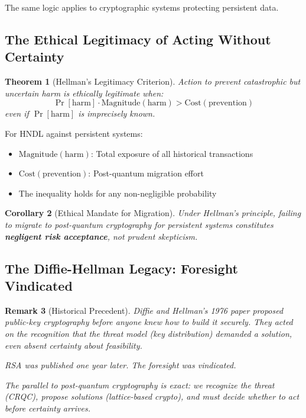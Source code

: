 \documentclass[11pt,a4paper]{article}
\newtheorem{theorem}{Theorem}[section]
\newtheorem{corollary}[theorem]{Corollary}
\newtheorem{remark}[theorem]{Remark}
\begin{document}
The same logic applies to cryptographic systems protecting persistent data.

\subsection{The Ethical Legitimacy of Acting Without Certainty}

\begin{theorem}[Hellman's Legitimacy Criterion]
Action to prevent catastrophic but uncertain harm is ethically legitimate when:
\begin{equation}
\Pr[\text{harm}] \cdot \text{Magnitude}(\text{harm}) > \text{Cost}(\text{prevention})
\end{equation}
even if $\Pr[\text{harm}]$ is imprecisely known.
\end{theorem}

For HNDL against persistent systems:
\begin{itemize}[noitemsep]
    \item $\text{Magnitude}(\text{harm})$: Total exposure of all historical transactions
    \item $\text{Cost}(\text{prevention})$: Post-quantum migration effort
    \item The inequality holds for any non-negligible probability
\end{itemize}

\begin{corollary}[Ethical Mandate for Migration]
Under Hellman's principle, failing to migrate to post-quantum cryptography for persistent systems constitutes \textbf{negligent risk acceptance}, not prudent skepticism.
\end{corollary}

\subsection{The Diffie-Hellman Legacy: Foresight Vindicated}

\begin{remark}[Historical Precedent]
Diffie and Hellman's 1976 paper proposed public-key cryptography \textit{before} anyone knew how to build it securely. They acted on the recognition that the threat model (key distribution) demanded a solution, even absent certainty about feasibility.

RSA was published one year later. The foresight was vindicated.

The parallel to post-quantum cryptography is exact: we recognize the threat (CRQC), propose solutions (lattice-based crypto), and must decide whether to act before certainty arrives.
\end{remark}
\end{document}

